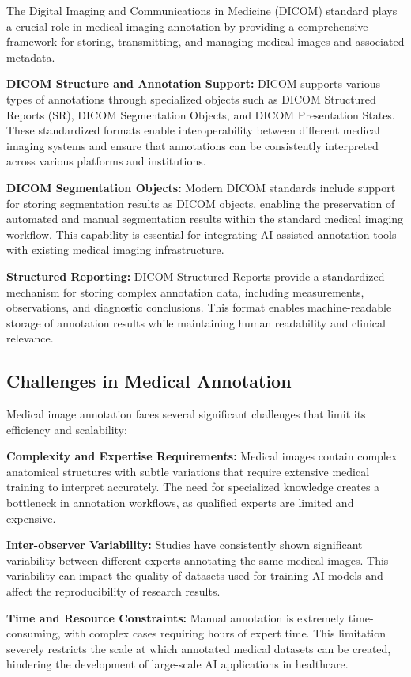 The Digital Imaging and Communications in Medicine (DICOM) standard plays a crucial role in medical imaging annotation by providing a comprehensive framework for storing, transmitting, and managing medical images and associated metadata.

\textbf{DICOM Structure and Annotation Support:} DICOM supports various types of annotations through specialized objects such as DICOM Structured Reports (SR), DICOM Segmentation Objects, and DICOM Presentation States. These standardized formats enable interoperability between different medical imaging systems and ensure that annotations can be consistently interpreted across various platforms and institutions.

\textbf{DICOM Segmentation Objects:} Modern DICOM standards include support for storing segmentation results as DICOM objects, enabling the preservation of automated and manual segmentation results within the standard medical imaging workflow. This capability is essential for integrating AI-assisted annotation tools with existing medical imaging infrastructure.

\textbf{Structured Reporting:} DICOM Structured Reports provide a standardized mechanism for storing complex annotation data, including measurements, observations, and diagnostic conclusions. This format enables machine-readable storage of annotation results while maintaining human readability and clinical relevance.

\subsection{Challenges in Medical Annotation}

Medical image annotation faces several significant challenges that limit its efficiency and scalability:

\textbf{Complexity and Expertise Requirements:} Medical images contain complex anatomical structures with subtle variations that require extensive medical training to interpret accurately. The need for specialized knowledge creates a bottleneck in annotation workflows, as qualified experts are limited and expensive.

\textbf{Inter-observer Variability:} Studies have consistently shown significant variability between different experts annotating the same medical images. This variability can impact the quality of datasets used for training AI models and affect the reproducibility of research results.

\textbf{Time and Resource Constraints:} Manual annotation is extremely time-consuming, with complex cases requiring hours of expert time. This limitation severely restricts the scale at which annotated medical datasets can be created, hindering the development of large-scale AI applications in healthcare.

